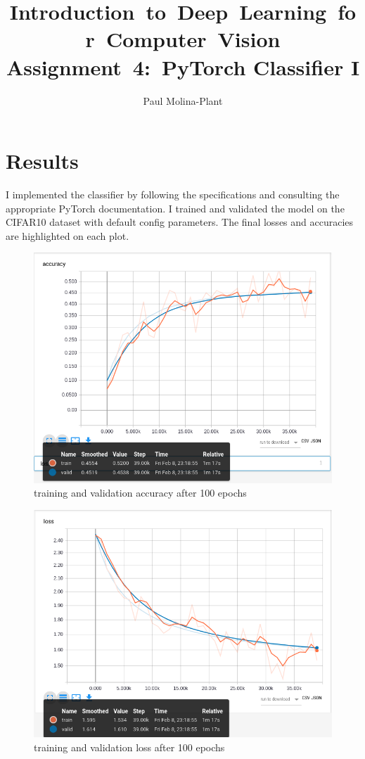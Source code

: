 \documentclass[12pt, letter]{article}
\newcommand{\courseName}{Introduction~to~Deep~Learning~for~Computer~Vision}
\newcommand{\assignName}{Assignment~4:~PyTorch Classifier I}
\begin{document}
\pagestyle{titlesec_assignment}

\title{\courseName\\\assignName}
\author{Paul Molina-Plant}
\maketitle


\section{Results}

I implemented the classifier by following the specifications and consulting the
appropriate PyTorch documentation. I trained and validated the model on the CIFAR10 dataset
with default config parameters. The final losses and accuracies are highlighted on each plot.
\begin{figure}[H]
  \centering
  \includegraphics[scale=2.0]{accuracy.png}
  \caption{training and validation accuracy after 100 epochs}
  \label{fig:eg}
\end{figure}
\begin{figure}[H]
  \centering
  \includegraphics[scale=2.0]{loss.png}
  \caption{training and validation loss after 100 epochs}
  \label{fig:eg}
\end{figure}
\end{document}
